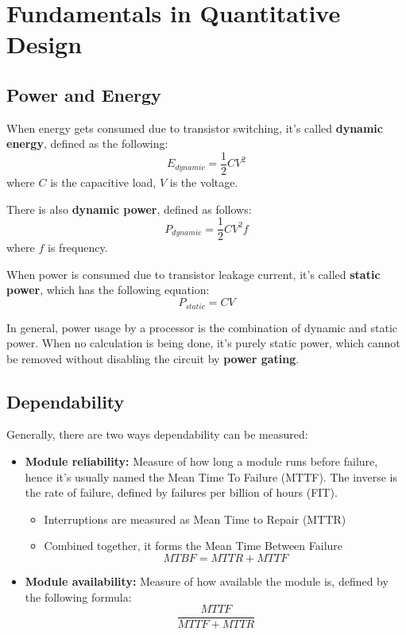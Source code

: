 \documentclass{article}
\theoremstyle{remark}
\begin{document}
\section{Fundamentals in Quantitative Design}
\subsection{Power and Energy}
When energy gets consumed due to transistor switching, it's called \textbf{dynamic energy}, defined as the following:
\[
    E_{dynamic} = \frac{1}{2} C V^2
\]
where \(C\) is the capacitive load, \(V\) is the voltage.

There is also \textbf{dynamic power}, defined as follows:
\[
    P_{dynamic} = \frac{1}{2} C V^2 f
\]
where \(f\) is frequency.

When power is consumed due to transistor leakage current, it's called \textbf{static power}, which has the following equation:
\[
    P_{static} = CV
\]

In general, power usage by a processor is the combination of dynamic and static power. When no calculation is being done, it's purely static power, which cannot be removed without disabling the circuit by \textbf{power gating}.

\subsection{Dependability}
Generally, there are two ways dependability can be measured:

\begin{itemize}
    \item \textbf{Module reliability:} Measure of how long a module runs before failure, hence it's usually named the Mean Time To Failure (MTTF). The inverse is the rate of failure, defined by failures per billion of hours (FIT).
          \begin{itemize}
              \item Interruptions are measured as Mean Time to Repair (MTTR)
              \item Combined together, it forms the Mean Time Between Failure \[MTBF = MTTR + MTTF\]
          \end{itemize}
    \item \textbf{Module availability:} Measure of how available the module is, defined by the following formula: \[
              \frac{MTTF}{MTTF+MTTR}
          \]
\end{itemize}
\end{document}

